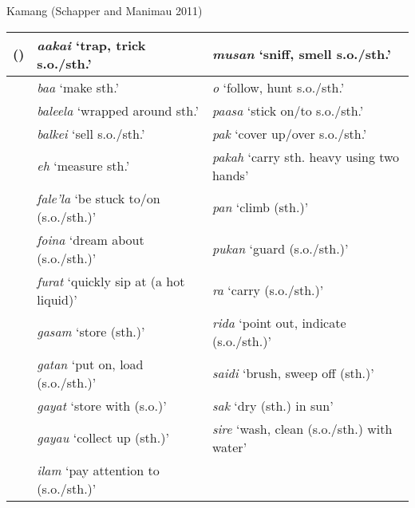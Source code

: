 Kamang (Schapper and Manimau 2011)

\begin{flushleft}
\tablehead{}
\begin{supertabular}{|m{0.48795983in}|m{2.5781598in}|m{2.54066in}|}
\hline
\label{bkm:Ref353454210}() &
\textit{aakai} {\textquoteleft}trap, trick s.o./sth.{\textquoteright} &
\textit{musan} {\textquoteleft}sniff, smell s.o./sth.{\textquoteright}\\\hline
 &
\textit{baa }{\textquoteleft}make sth.{\textquoteright} &
\textit{o} {\textquoteleft}follow, hunt s.o./sth.{\textquoteright}\\\hline
 &
\textit{baleela }{\textquoteleft}wrapped around sth.{\textquoteright} &
\textit{paasa} {\textquoteleft}stick on/to s.o./sth.{\textquoteright}\\\hline
 &
\textit{balkei} {\textquoteleft}sell s.o./sth.{\textquoteright} &
\textit{pak} {\textquoteleft}cover up/over s.o./sth.{\textquoteright}\\\hline
 &
\textit{eh} {\textquoteleft}measure sth.{\textquoteright} &
\textit{pakah} {\textquoteleft}carry sth. heavy using two hands{\textquoteright}\\\hline
 &
\textit{fale{\textquoteright}la} {\textquoteleft}be stuck to/on (s.o./sth.){\textquoteright} &
\textit{pan} {\textquoteleft}climb (sth.){\textquoteright}\\\hline
 &
\textit{foina} {\textquoteleft}dream about (s.o./sth.){\textquoteright} &
\textit{pukan} {\textquoteleft}guard (s.o./sth.){\textquoteright}\\\hline
 &
\textit{furat} {\textquoteleft}quickly sip at (a hot liquid){\textquoteright} &
\textit{ra} {\textquoteleft}carry (s.o./sth.){\textquoteright}\\\hline
 &
\textit{gasam} {\textquoteleft}store (sth.){\textquoteright} &
\textit{rida} {\textquoteleft}point out, indicate (s.o./sth.){\textquoteright}\\\hline
 &
\textit{gatan} {\textquoteleft}put on, load (s.o./sth.){\textquoteright} &
\textit{saidi} {\textquoteleft}brush, sweep off (sth.){\textquoteright}\\\hline
 &
\textit{gayat} {\textquoteleft}store with (s.o.){\textquoteright} &
\textit{sak} {\textquoteleft}dry (sth.) in sun{\textquoteright}\\\hline
 &
\textit{gayau} {\textquoteleft}collect up (sth.){\textquoteright} &
\textit{sire} {\textquoteleft}wash, clean (s.o./sth.) with water{\textquoteright}\\\hline
 &
\textit{ilam} {\textquoteleft}pay attention to (s.o./sth.){\textquoteright} &

\end{supertabular}
\end{flushleft}
